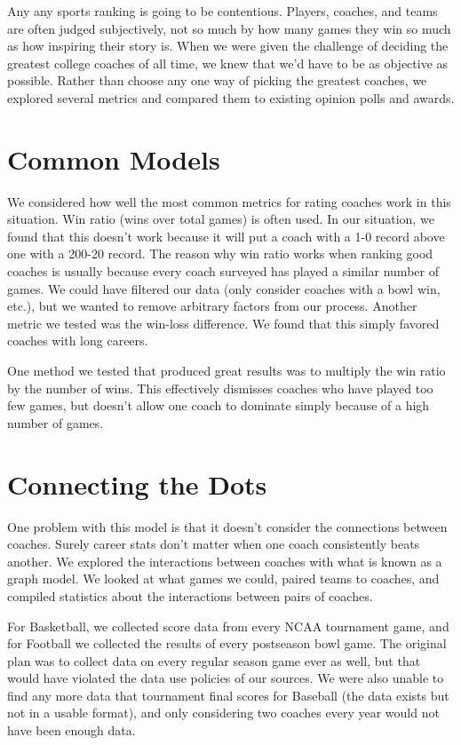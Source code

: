 \documentclass[12pt]{article}
\begin{document}
Any any sports ranking is going to be contentious. Players, coaches, and teams are often judged subjectively, not so much by how many games they win so much as how inspiring their story is. When we were given the challenge of deciding the greatest college coaches of all time, we knew that we'd have to be as objective as possible. Rather than choose any one way of picking the greatest coaches, we explored several metrics and compared them to existing opinion polls and awards.

\section{Common Models}
We considered how well the most common metrics for rating coaches work in this situation. Win ratio (wins over total games) is often used. In our situation, we found that this doesn't work because it will put a coach with a 1-0 record above one with a 200-20 record. The reason why win ratio works when ranking good coaches is usually because every coach surveyed has played a similar number of games. We could have filtered our data (only consider coaches with a bowl win, etc.), but we wanted to remove arbitrary factors from our process. Another metric we tested was the win-loss difference. We found that this simply favored coaches with long careers.

One method we tested that produced great results was to multiply the win ratio by the number of wins. This effectively dismisses coaches who have played too few games, but doesn't allow one coach to dominate simply because of a high number of games.

\section{Connecting the Dots}
One problem with this model is that it doesn't consider the connections between coaches. Surely career stats don't matter when one coach consistently beats another. We explored the interactions between coaches with what is known as a graph model. We looked at what games we could, paired teams to coaches, and compiled statistics about the interactions between pairs of coaches.

For Basketball, we collected score data from every NCAA tournament game, and for Football we collected the results of every postseason bowl game. The original plan was to collect data on every regular season game ever as well, but that would have violated the data use policies of our sources. We were also unable to find any more data that tournament final scores for Baseball (the data exists but not in a usable format), and only considering two coaches every year would not have been enough data.
\end{document}
